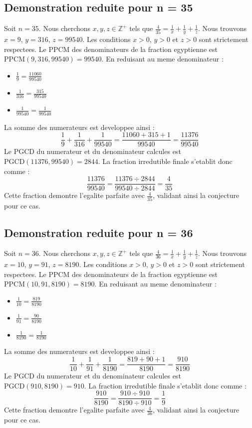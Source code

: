\documentclass[11pt,a4paper]{article}
\begin{document}
\subsection{Demonstration reduite pour n = 35}
Soit $n = 35$. Nous cherchons $x, y, z \in \mathbb{Z}^{+}$ tels que $\frac{4}{35} = \frac{1}{x} + \frac{1}{y} + \frac{1}{z}$.
Nous trouvons $x = 9$, $y = 316$, $z = 99540$.
Les conditions $x > 0$, $y > 0$ et $z > 0$ sont strictement respectees.
Le PPCM des denominateurs de la fraction egyptienne est $\text{PPCM}(9, 316, 99540) = 99540$.
En reduisant au meme denominateur :
\begin{itemize}
    \item $\frac{1}{9} = \frac{11060}{99540}$
    \item $\frac{1}{316} = \frac{315}{99540}$
    \item $\frac{1}{99540} = \frac{1}{99540}$
\end{itemize}
La somme des numerateurs est developpee ainsi :
$$ \frac{1}{9} + \frac{1}{316} + \frac{1}{99540} = \frac{11060 + 315 + 1}{99540} = \frac{11376}{99540} $$
Le PGCD du numerateur et du denominateur calcules est $\text{PGCD}(11376, 99540) = 2844$.
La fraction irredutible finale s'etablit donc comme :
$$ \frac{11376}{99540} = \frac{11376 \div 2844}{99540 \div 2844} = \frac{4}{35} $$
Cette fraction demontre l'egalite parfaite avec $\frac{4}{35}$, validant ainsi la conjecture pour ce cas.

\subsection{Demonstration reduite pour n = 36}
Soit $n = 36$. Nous cherchons $x, y, z \in \mathbb{Z}^{+}$ tels que $\frac{4}{36} = \frac{1}{x} + \frac{1}{y} + \frac{1}{z}$.
Nous trouvons $x = 10$, $y = 91$, $z = 8190$.
Les conditions $x > 0$, $y > 0$ et $z > 0$ sont strictement respectees.
Le PPCM des denominateurs de la fraction egyptienne est $\text{PPCM}(10, 91, 8190) = 8190$.
En reduisant au meme denominateur :
\begin{itemize}
    \item $\frac{1}{10} = \frac{819}{8190}$
    \item $\frac{1}{91} = \frac{90}{8190}$
    \item $\frac{1}{8190} = \frac{1}{8190}$
\end{itemize}
La somme des numerateurs est developpee ainsi :
$$ \frac{1}{10} + \frac{1}{91} + \frac{1}{8190} = \frac{819 + 90 + 1}{8190} = \frac{910}{8190} $$
Le PGCD du numerateur et du denominateur calcules est $\text{PGCD}(910, 8190) = 910$.
La fraction irredutible finale s'etablit donc comme :
$$ \frac{910}{8190} = \frac{910 \div 910}{8190 \div 910} = \frac{1}{9} $$
Cette fraction demontre l'egalite parfaite avec $\frac{4}{36}$, validant ainsi la conjecture pour ce cas.
\end{document}
